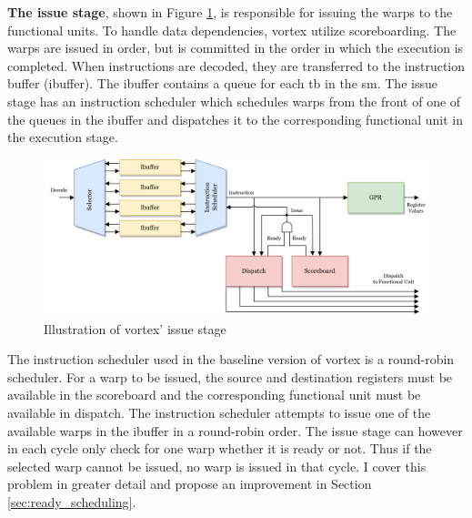 \vspace{1mm}\noindent
\textbf{The issue stage}, shown in Figure \ref{fig:baseline_issue_stage}, is responsible for issuing the warps to the functional units. To handle data dependencies, \Gls{vortex} utilize scoreboarding. The warps are issued in order, but is committed in the order in which the execution is completed. When instructions are decoded, they are transferred to the instruction buffer (ibuffer). The ibuffer contains a queue for each \acrshort{tb} in the \acrshort{sm}. The issue stage has an instruction scheduler which schedules warps from the front of one of the queues in the ibuffer and dispatches it to the corresponding functional unit in the execution stage.

\begin{figure}
    \centering
    \includegraphics[width=\textwidth]{figures/Baseline Issue Stage.png}
    \caption{Illustration of \Gls{vortex}' issue stage}
    \label{fig:baseline_issue_stage}
\end{figure}

The instruction scheduler used in the baseline version of \Gls{vortex} is a round-robin scheduler. For a warp to be issued, the source and destination registers must be available in the scoreboard and the corresponding functional unit must be available in dispatch. The instruction scheduler attempts to issue one of the available warps in the ibuffer in a round-robin order. The issue stage can however in each cycle only check for one warp whether it is ready or not. Thus if the selected warp cannot be issued, no warp is issued in that cycle. I cover this problem in greater detail and propose an improvement in Section \ref{sec:ready_scheduling}. 

